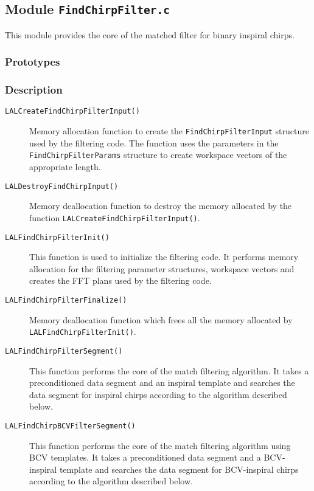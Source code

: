 \subsection{Module \texttt{FindChirpFilter.c}}
\label{ss:FindChirpFilter.c}

This module provides the core of the matched filter for binary inspiral
chirps.

\subsubsection*{Prototypes}
\vspace{0.1in}


\subsubsection*{Description}

\begin{description}
\item[\texttt{LALCreateFindChirpFilterInput()}] Memory allocation function to
create the \texttt{FindChirpFilterInput} structure used by the filtering code.
The function uses the parameters in the \texttt{FindChirpFilterParams}
structure to create workspace vectors of the appropriate length.

\item[\texttt{LALDestroyFindChirpInput()}] Memory deallocation function to
destroy the memory allocated by the function
\texttt{LALCreateFindChirpFilterInput()}.

\item[\texttt{LALFindChirpFilterInit()}] This function is used to initialize
the filtering code. It performs memory allocation for the filtering parameter
structures, workspace vectors and creates the FFT plans used by the filtering
code.

\item[\texttt{LALFindChirpFilterFinalize()}] Memory deallocation function
which frees all the memory allocated by \texttt{LALFindChirpFilterInit()}.

\item[\texttt{LALFindChirpFilterSegment()}] This function performs the core of
the match filtering algorithm. It takes a preconditioned data segment and an
inspiral template and searches the data segment for inspiral chirps according
to the algorithm described below.

\item[\texttt{LALFindChirpBCVFilterSegment()}] This function performs the core
of the match filtering algorithm using BCV templates. It takes a preconditioned
data segment and a
BCV-inspiral template and searches the data segment for BCV-inspiral chirps
according to the algorithm described below.

\end{description}

